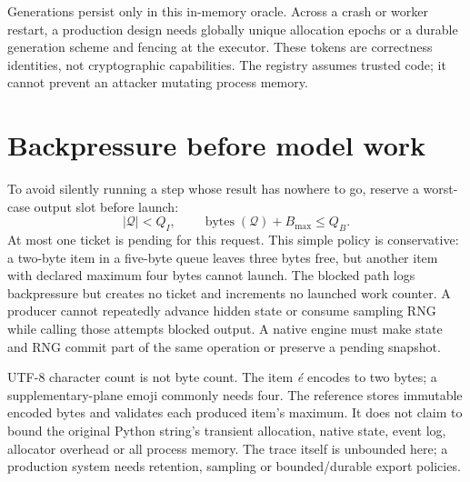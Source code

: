 Generations persist only in this in-memory oracle. Across a crash or worker restart,
a production design needs globally unique allocation epochs or a durable generation
scheme and fencing at the executor. These tokens are correctness identities, not
cryptographic capabilities. The registry assumes trusted code; it cannot prevent an
attacker mutating process memory.

\section{Backpressure before model work}
To avoid silently running a step whose result has nowhere to go, reserve a worst-case
output slot before launch:
\[
 |\mathcal Q|<Q_I,\qquad
 \operatorname{bytes}(\mathcal Q)+B_{\max}\le Q_B.
\]
At most one ticket is pending for this request.
This simple policy is conservative: a two-byte item in a five-byte queue leaves
three bytes free, but another item with declared maximum four bytes cannot launch.
The blocked path logs backpressure but creates no ticket and increments no launched
work counter. A producer cannot repeatedly advance hidden state or consume sampling
RNG while calling those attempts blocked output. A native engine must make state
and RNG commit part of the same operation or preserve a pending snapshot.

UTF-8 character count is not byte count. The item \emph{é} encodes to two bytes;
a supplementary-plane emoji commonly needs four. The reference stores immutable
encoded bytes and validates each produced item's maximum. It does not claim to
bound the original Python string's transient allocation, native state, event log,
allocator overhead or all process memory. The trace itself is unbounded here;
a production system needs retention, sampling or bounded/durable export policies.

